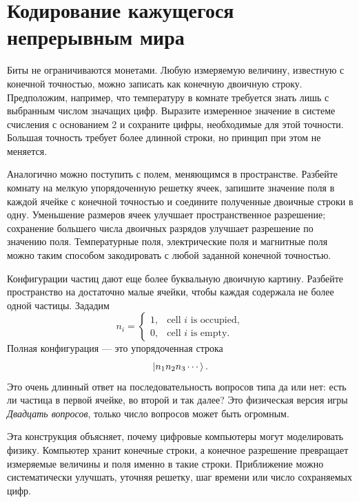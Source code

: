 \section{Кодирование кажущегося непрерывным мира}

Биты не ограничиваются монетами. Любую измеряемую величину, известную с конечной точностью, можно записать как конечную двоичную строку. Предположим, например, что температуру в комнате требуется знать лишь с выбранным числом значащих цифр. Выразите измеренное значение в системе счисления с основанием 2 и сохраните цифры, необходимые для этой точности. Большая точность требует более длинной строки, но принцип при этом не меняется.

Аналогично можно поступить с полем, меняющимся в пространстве. Разбейте комнату на мелкую упорядоченную решетку ячеек, запишите значение поля в каждой ячейке с конечной точностью и соедините полученные двоичные строки в одну. Уменьшение размеров ячеек улучшает пространственное разрешение; сохранение большего числа двоичных разрядов улучшает разрешение по значению поля. Температурные поля, электрические поля и магнитные поля можно таким способом закодировать с любой заданной конечной точностью.

Конфигурации частиц дают еще более буквальную двоичную картину. Разбейте пространство на достаточно малые ячейки, чтобы каждая содержала не более одной частицы. Зададим
\begin{equation}
  n_i=
  \begin{cases}
    1,&\text{cell \(i\) is occupied},\\
    0,&\text{cell \(i\) is empty}.
  \end{cases}
  \label{eq:l01-occupancy-bit}
\end{equation}
Полная конфигурация — это упорядоченная строка
\begin{equation}
  \left\lvert n_1n_2n_3\cdots\right\rangle.
\end{equation}
Это очень длинный ответ на последовательность вопросов типа да или нет: есть ли частица в первой ячейке, во второй и так далее? Это физическая версия игры \emph{Двадцать вопросов}, только число вопросов может быть огромным.

Эта конструкция объясняет, почему цифровые компьютеры могут моделировать физику. Компьютер хранит конечные строки, а конечное разрешение превращает измеряемые величины и поля именно в такие строки. Приближение можно систематически улучшать, уточняя решетку, шаг времени или число сохраняемых цифр.

\begin{classroomqa}
\end{classroomqa}

